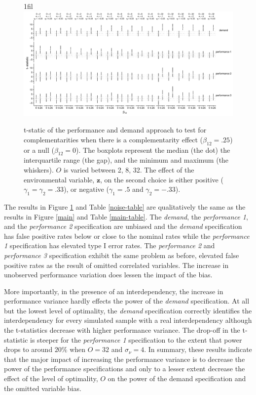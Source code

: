 \documentclass[12pt]{article}
\makeatletter
\newcommand*{\centerfloat}{%
  \parindent \z@
  \leftskip \z@ \@plus 1fil \@minus \textwidth
  \rightskip\leftskip
  \parfillskip \z@skip}
\makeatother
\begin{document}
\begin{figure}
\centerfloat
\includegraphics[width=600px]{figure-latex/noise_plot.pdf}
\caption[Error Rate and Power with Increasing Levels of Variability in Performance]
{\label{noise} t-static of the performance and demand approach to test
for complementarities when there is a complementarity effect ($\beta_{12} = .25$)
or a null ($\beta_{12} = 0$). The boxplots represent the median (the dot) the
interquartile range (the gap), and the minimum and maximum (the whiskers). $O$
is varied between 2, 8, 32. The effect of the environmental
variable, $\mathbf{z}$, on the second choice is either positive
($\gamma_1 = \gamma_2 = .33$), or negative ($\gamma_1 = .5$ and $\gamma_2 = -.33$).}
\end{figure}



The results in Figure \ref{noise} and Table \ref{noise-table} are qualitatively the same as the results in Figure \ref{main} and Table \ref{main-table}. The \emph{demand}, the \emph{performance 1}, and the \emph{performance 2} specification are unbiased and the \emph{demand} specification has false positive rates below or close to the nominal rates while the \emph{performance 1} specification has elevated type I error rates. The \emph{performance 2} and \emph{performance 3} specification exhibit the same problem as before, elevated false positive rates as the result of omitted correlated variables. The increase in unobserved performance variation does lessen the impact of the bias.

More importantly, in the presence of an interdependency, the increase in performance variance hardly effects the power of the \emph{demand} specification. At all but the lowest level of optimality, the \emph{demand} specification correctly identifies the interdependency for every simulated sample with a real interdependency although the t-statistics decrease with higher performance variance. The drop-off in the t-statistic is steeper for the \emph{performance 1} specification to the extent that power drops to around \(20\%\) when \(O = 32\) and \(\sigma_{\nu} = 4\). In summary, these results indicate that the major impact of increasing the performance variance is to decrease the power of the performance specifications and only to a lesser extent decrease the effect of the level of optimality, $O$ on the power of the demand specification and the omitted variable bias.
\end{document}
